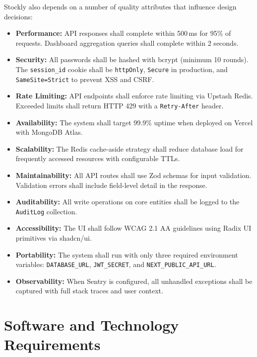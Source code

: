 \documentclass[12pt,a4paper]{report}
\begin{document}
Stockly also depends on a number of quality attributes that influence design decisions:
\begin{itemize}
    \item \textbf{Performance:} API responses shall complete within 500\,ms for 95\% of requests. Dashboard aggregation queries shall complete within 2 seconds.
    \item \textbf{Security:} All passwords shall be hashed with bcrypt (minimum 10 rounds). The \texttt{session\_id} cookie shall be \texttt{httpOnly}, \texttt{Secure} in production, and \texttt{SameSite=Strict} to prevent XSS and CSRF.
    \item \textbf{Rate Limiting:} API endpoints shall enforce rate limiting via Upstash Redis. Exceeded limits shall return HTTP 429 with a \texttt{Retry-After} header.
    \item \textbf{Availability:} The system shall target 99.9\% uptime when deployed on Vercel with MongoDB Atlas.
    \item \textbf{Scalability:} The Redis cache-aside strategy shall reduce database load for frequently accessed resources with configurable TTLs.
    \item \textbf{Maintainability:} All API routes shall use Zod schemas for input validation. Validation errors shall include field-level detail in the response.
    \item \textbf{Auditability:} All write operations on core entities shall be logged to the \texttt{AuditLog} collection.
    \item \textbf{Accessibility:} The UI shall follow WCAG 2.1 AA guidelines using Radix UI primitives via shadcn/ui.
    \item \textbf{Portability:} The system shall run with only three required environment variables: \texttt{DATABASE\_URL}, \texttt{JWT\_SECRET}, and \texttt{NEXT\_PUBLIC\_API\_URL}.
    \item \textbf{Observability:} When Sentry is configured, all unhandled exceptions shall be captured with full stack traces and user context.
\end{itemize}

\section{Software and Technology Requirements}
\end{document}
